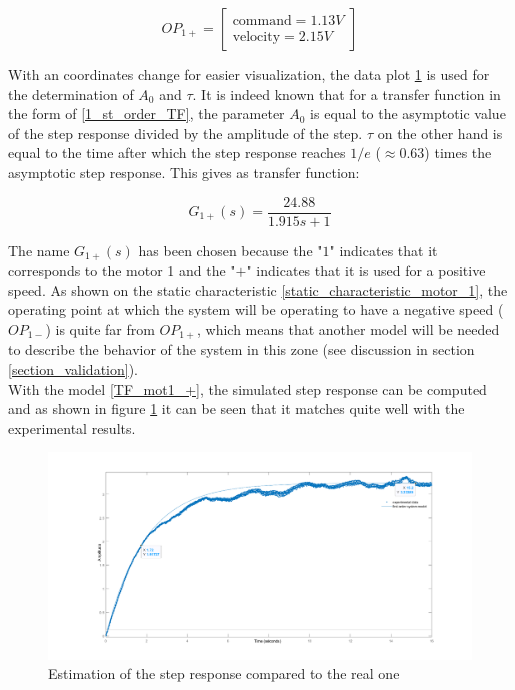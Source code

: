\begin{equation}
    OP_{1+} = \begin{bmatrix}
        \text{command} = 1.13 V \\
        \text{velocity} = 2.15 V
    \end{bmatrix}
\end{equation}

With an coordinates change for easier visualization, the data plot \ref{estimated_step_response_positive_motor_1} is 
used for the determination of $A_0$ and $\tau$. It is indeed known that for a transfer function in the form of 
\ref{1_st_order_TF}, the parameter $A_0$ is equal to the asymptotic value of the step response divided by the amplitude 
of the step. $\tau$ on the other hand is equal to the time after which the step response reaches $1/e$ ($\approx 0.63$)
times the asymptotic step response. This gives as transfer function:

\begin{equation}
    G_{1+}(s) = \frac{24.88}{1.915s + 1}
    \label{TF_mot1_+}
\end{equation}

The name $G_{1+}(s)$ has been chosen because the "\textit{$1$}" indicates that it corresponds to the motor 1 and the 
"\textit{$+$}" indicates that it is used for a positive speed. As shown on the static characteristic 
\ref{static_characteristic_motor_1}, the operating point at which the system will be operating to have a negative speed 
($OP_{1-}$) is quite far from $OP_{1+}$, which means that another model will be needed to describe the behavior of the 
system in this zone (see discussion in section \ref{section_validation}).\\

With the model \ref{TF_mot1_+}, the simulated step response can be computed and as shown in figure 
\ref{estimated_step_response_positive_motor_1} it can be seen that it matches quite well with the experimental results.

\begin{figure}[H]
    \centering
    \includegraphics[height=\textheight/3]{Pictures/first_order_model_positive_motor_1.png}
    \caption{Estimation of the step response compared to the real one}
    \label{estimated_step_response_positive_motor_1}
\end{figure}

